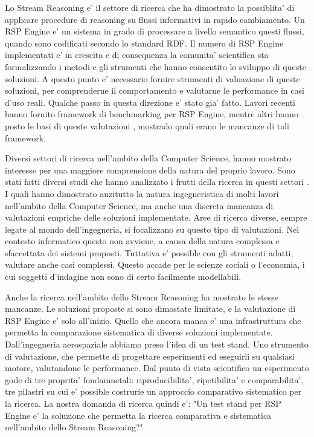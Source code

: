 Lo Stream Reasoning e' il settore di ricerca che ha dimostrato la possiblita' di applicare procedure di reasoning su flussi informativi in rapido cambiamento. Un RSP Engine e' un sistema in grado di processare a livello semantico questi flussi, quando sono codificati secondo lo standard RDF. Il numero di RSP Engine implementati e' in crescita e di consequenza la comunita' scientifica sta formalizzando i metodi e gli strumenti che hanno consentito lo sviluppo di queste soluzioni. A questo punto e' necessario fornire strumenti di valuazione di queste soluzioni, per comprenderne il comportamento e valutarne le performance in casi d'uso reali. 
Qualche passo in questa direzione e' stato gia' fatto. Lavori recenti \cite{Zhang2012, LePhuoc2012c, DBLP:conf/semweb/DellAglioCBCV13} hanno fornito framework di benchmarking per RSP Engine, mentre altri hanno posto le basi di queste valutazioni \cite{DBLP:conf/esws/ScharrenbachUMVB13}, mostrado quali erano le mancanze di tali framework.

Diversi settori di ricerca nell'ambito della Computer Science, hanno mostrato interesse per una maggiore comprensione della natura del proprio lavoro. Sono stati fatti diversi studi che hanno analizzato i frutti della ricerca in questi settori \cite{Tichy:1995:EEC:209090.209093, Wainer:2009:EEC:1518331.1518552}. I quali hanno dimostrato anzitutto la natura ingegneristica di molti lavori nell'ambito della Computer Science, ma anche una discreta mancanza di valutazioni empriche delle soluzioni implementate. Aree di ricerca diverse, sempre legate al mondo dell'ingegneria, si focalizzano su questo tipo di valutazioni. Nel contesto informatico questo non avviene, a causa della natura complessa e sfaccettata dei sistemi proposti. Tuttativa e' possible con gli strumenti adatti, valutare anche casi complessi. Questo accade per le scienze sociali o l'economia, i cui soggetti d'indagine non sono di certo facilmente modellabili.

Anche la ricerca nell'ambito dello Stream Reasoning ha mostrato le stesse mancanze. Le soluzioni proposte si sono dimostate limitate, e la valutazione di RSP Engine e' solo all'inizio. Quello che ancora manca e' una infrastruttura che permetta la comparazione sistematica di diverse soluzioni implementate. Dall'ingegneria aerospaziale abbiamo preso l'idea di un test stand. Uno strumento di valutazione, che permette di progettare esperimenti ed eseguirli su qualsiasi motore, valutandone le performance. Dal punto di vista scientifico un esperimento gode di tre proprita' fondamnetali: riproducibilita', ripetibilita' e comparabilita', tre pilastri su cui e' possible costrurie un approccio comparativo sistematico per la ricerca. La nostra domanda di ricerca quindi e': "Un test stand per RSP Engine e' la soluzione che permetta la ricerca comparativa e sistematica nell'ambito dello Stream Reasoning?"

